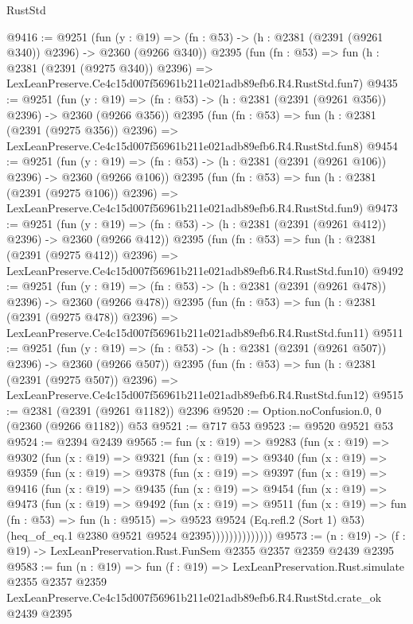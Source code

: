 \begin{lexlean}{RustStd}
\begin{coremodule}
@9416 := @9251
    (fun (y : @19) => (fn : @53) -> (h : @2381 (@2391 (@9261 @340)) @2396) -> @2360 (@9266 @340))
    @2395
    (fun (fn : @53) =>
    fun (h : @2381 (@2391 (@9275 @340)) @2396) =>
    LexLeanPreserve.Ce4c15d007f56961b211e021adb89efb6.R4.RustStd.fun7)
@9435 := @9251
    (fun (y : @19) => (fn : @53) -> (h : @2381 (@2391 (@9261 @356)) @2396) -> @2360 (@9266 @356))
    @2395
    (fun (fn : @53) =>
    fun (h : @2381 (@2391 (@9275 @356)) @2396) =>
    LexLeanPreserve.Ce4c15d007f56961b211e021adb89efb6.R4.RustStd.fun8)
@9454 := @9251
    (fun (y : @19) => (fn : @53) -> (h : @2381 (@2391 (@9261 @106)) @2396) -> @2360 (@9266 @106))
    @2395
    (fun (fn : @53) =>
    fun (h : @2381 (@2391 (@9275 @106)) @2396) =>
    LexLeanPreserve.Ce4c15d007f56961b211e021adb89efb6.R4.RustStd.fun9)
@9473 := @9251
    (fun (y : @19) => (fn : @53) -> (h : @2381 (@2391 (@9261 @412)) @2396) -> @2360 (@9266 @412))
    @2395
    (fun (fn : @53) =>
    fun (h : @2381 (@2391 (@9275 @412)) @2396) =>
    LexLeanPreserve.Ce4c15d007f56961b211e021adb89efb6.R4.RustStd.fun10)
@9492 := @9251
    (fun (y : @19) => (fn : @53) -> (h : @2381 (@2391 (@9261 @478)) @2396) -> @2360 (@9266 @478))
    @2395
    (fun (fn : @53) =>
    fun (h : @2381 (@2391 (@9275 @478)) @2396) =>
    LexLeanPreserve.Ce4c15d007f56961b211e021adb89efb6.R4.RustStd.fun11)
@9511 := @9251
    (fun (y : @19) => (fn : @53) -> (h : @2381 (@2391 (@9261 @507)) @2396) -> @2360 (@9266 @507))
    @2395
    (fun (fn : @53) =>
    fun (h : @2381 (@2391 (@9275 @507)) @2396) =>
    LexLeanPreserve.Ce4c15d007f56961b211e021adb89efb6.R4.RustStd.fun12)
@9515 := @2381 (@2391 (@9261 @1182)) @2396
@9520 := Option.noConfusion.{0, 0} (@2360 (@9266 @1182)) @53
@9521 := @717 @53
@9523 := @9520 @9521 @53
@9524 := @2394 @2439
@9565 := fun (x : @19) =>
  @9283
    (fun (x : @19) =>
    @9302
      (fun (x : @19) =>
      @9321
        (fun (x : @19) =>
        @9340
          (fun (x : @19) =>
          @9359
            (fun (x : @19) =>
            @9378
              (fun (x : @19) =>
              @9397
                (fun (x : @19) =>
                @9416
                  (fun (x : @19) =>
                  @9435
                    (fun (x : @19) =>
                    @9454
                      (fun (x : @19) =>
                      @9473
                        (fun (x : @19) =>
                        @9492
                          (fun (x : @19) =>
                          @9511
                            (fun (x : @19) =>
                            fun (fn : @53) =>
                            fun (h : @9515) =>
                            @9523
                              @9524
                              (Eq.refl.{2} (Sort 1) @53)
                              (heq_of_eq.{1} @2380 @9521 @9524 @2395))))))))))))))
@9573 := (n : @19) -> (f : @19) -> LexLeanPreservation.Rust.FunSem @2355 @2357 @2359 @2439 @2395
@9583 := fun (n : @19) =>
  fun (f : @19) =>
  LexLeanPreservation.Rust.simulate
    @2355
    @2357
    @2359
    LexLeanPreserve.Ce4c15d007f56961b211e021adb89efb6.R4.RustStd.crate_ok
    @2439
    @2395
\end{coremodule}
\end{lexlean}
